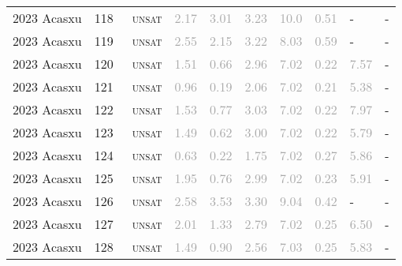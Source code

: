 \begin{center}
{\begin{longtable}{@{}llllllllll@{}}
2023 Acasxu & 118 & ~\textsc{unsat} & \textcolor{darkgray}{2.17} & \textcolor{darkgray}{3.01} & \textcolor{darkgray}{3.23} & \textcolor{darkgray}{10.0} & \textcolor{darkgray}{0.51} & - & - \\
2023 Acasxu & 119 & ~\textsc{unsat} & \textcolor{darkgray}{2.55} & \textcolor{darkgray}{2.15} & \textcolor{darkgray}{3.22} & \textcolor{darkgray}{8.03} & \textcolor{darkgray}{0.59} & - & - \\
2023 Acasxu & 120 & ~\textsc{unsat} & \textcolor{darkgray}{1.51} & \textcolor{darkgray}{0.66} & \textcolor{darkgray}{2.96} & \textcolor{darkgray}{7.02} & \textcolor{darkgray}{0.22} & \textcolor{darkgray}{7.57} & - \\
2023 Acasxu & 121 & ~\textsc{unsat} & \textcolor{darkgray}{0.96} & \textcolor{darkgray}{0.19} & \textcolor{darkgray}{2.06} & \textcolor{darkgray}{7.02} & \textcolor{darkgray}{0.21} & \textcolor{darkgray}{5.38} & - \\
2023 Acasxu & 122 & ~\textsc{unsat} & \textcolor{darkgray}{1.53} & \textcolor{darkgray}{0.77} & \textcolor{darkgray}{3.03} & \textcolor{darkgray}{7.02} & \textcolor{darkgray}{0.22} & \textcolor{darkgray}{7.97} & - \\
2023 Acasxu & 123 & ~\textsc{unsat} & \textcolor{darkgray}{1.49} & \textcolor{darkgray}{0.62} & \textcolor{darkgray}{3.00} & \textcolor{darkgray}{7.02} & \textcolor{darkgray}{0.22} & \textcolor{darkgray}{5.79} & - \\
2023 Acasxu & 124 & ~\textsc{unsat} & \textcolor{darkgray}{0.63} & \textcolor{darkgray}{0.22} & \textcolor{darkgray}{1.75} & \textcolor{darkgray}{7.02} & \textcolor{darkgray}{0.27} & \textcolor{darkgray}{5.86} & - \\
2023 Acasxu & 125 & ~\textsc{unsat} & \textcolor{darkgray}{1.95} & \textcolor{darkgray}{0.76} & \textcolor{darkgray}{2.99} & \textcolor{darkgray}{7.02} & \textcolor{darkgray}{0.23} & \textcolor{darkgray}{5.91} & - \\
2023 Acasxu & 126 & ~\textsc{unsat} & \textcolor{darkgray}{2.58} & \textcolor{darkgray}{3.53} & \textcolor{darkgray}{3.30} & \textcolor{darkgray}{9.04} & \textcolor{darkgray}{0.42} & - & - \\
2023 Acasxu & 127 & ~\textsc{unsat} & \textcolor{darkgray}{2.01} & \textcolor{darkgray}{1.33} & \textcolor{darkgray}{2.79} & \textcolor{darkgray}{7.02} & \textcolor{darkgray}{0.25} & \textcolor{darkgray}{6.50} & - \\
2023 Acasxu & 128 & ~\textsc{unsat} & \textcolor{darkgray}{1.49} & \textcolor{darkgray}{0.90} & \textcolor{darkgray}{2.56} & \textcolor{darkgray}{7.03} & \textcolor{darkgray}{0.25} & \textcolor{darkgray}{5.83} & - \\

\end{longtable}}
\end{center}
